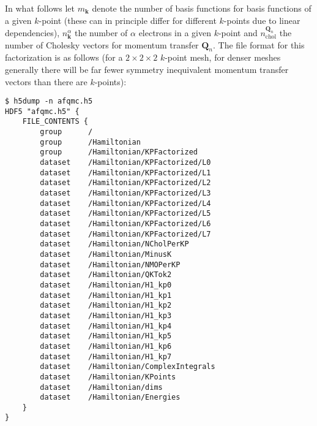 In what follows let $m_{\mathbf{k}}$ denote the number of basis functions for basis functions of a given $k$-point (these can in principle differ for different $k$-points due to linear dependencies), $n^{\alpha}_{\mathbf{k}}$ the number of $\alpha$ electrons in a given $k$-point and $n_{\mathrm{chol}}^{\mathbf{Q}_n}$ the number of Cholesky vectors for momentum transfer $\mathbf{Q}_n$.
The file format for this factorization is as follows (for a $2\times2\times2$ $k$-point mesh, for denser meshes generally there will be far fewer symmetry inequivalent momentum transfer vectors than there are $k$-points):
\begin{lstlisting}[style=SHELL,caption=Sample Dense $k$-point dependent Cholesky QMCPACK Hamtiltonian.]
$ h5dump -n afqmc.h5
HDF5 "afqmc.h5" {
    FILE_CONTENTS {
        group      /
        group      /Hamiltonian
        group      /Hamiltonian/KPFactorized
        dataset    /Hamiltonian/KPFactorized/L0
        dataset    /Hamiltonian/KPFactorized/L1
        dataset    /Hamiltonian/KPFactorized/L2
        dataset    /Hamiltonian/KPFactorized/L3
        dataset    /Hamiltonian/KPFactorized/L4
        dataset    /Hamiltonian/KPFactorized/L5
        dataset    /Hamiltonian/KPFactorized/L6
        dataset    /Hamiltonian/KPFactorized/L7
        dataset    /Hamiltonian/NCholPerKP
        dataset    /Hamiltonian/MinusK
        dataset    /Hamiltonian/NMOPerKP
        dataset    /Hamiltonian/QKTok2
        dataset    /Hamiltonian/H1_kp0
        dataset    /Hamiltonian/H1_kp1
        dataset    /Hamiltonian/H1_kp2
        dataset    /Hamiltonian/H1_kp3
        dataset    /Hamiltonian/H1_kp4
        dataset    /Hamiltonian/H1_kp5
        dataset    /Hamiltonian/H1_kp6
        dataset    /Hamiltonian/H1_kp7
        dataset    /Hamiltonian/ComplexIntegrals
        dataset    /Hamiltonian/KPoints
        dataset    /Hamiltonian/dims
        dataset    /Hamiltonian/Energies
    }
}
\end{lstlisting}
